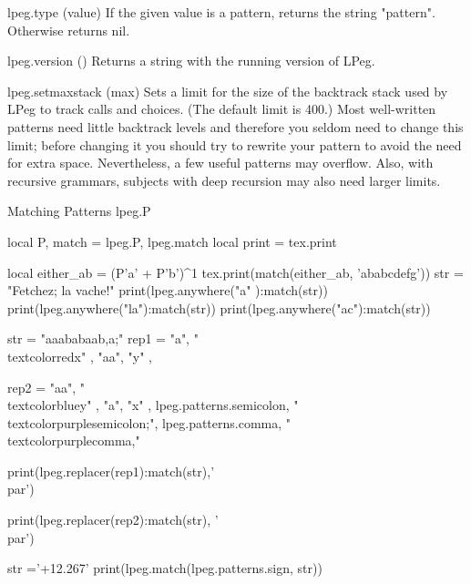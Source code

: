 \begin{docLpeg}{lpeg.type (value)}
If the given value is a pattern, returns the string "pattern". Otherwise returns nil.
\end{docLpeg}

\begin{docLpeg}{lpeg.version ()}
Returns a string with the running version of LPeg.
\end{docLpeg}

\begin{docLpeg}{lpeg.setmaxstack (max)}
Sets a limit for the size of the backtrack stack used by LPeg to track calls and choices. (The default limit is 400.) Most well-written patterns need little backtrack levels and therefore you seldom need to change this limit; before changing it you should try to rewrite your pattern to avoid the need for extra space. Nevertheless, a few useful patterns may overflow. Also, with recursive grammars, subjects with deep recursion may also need larger limits.
\end{docLpeg}


\begin{texexample}{Matching Patterns lpeg.P}{}
\begin{luacode}
local P, match = lpeg.P, lpeg.match
local print = tex.print
       
local either_ab = (P'a' + P'b')^1
        tex.print(match(either_ab,  'ababcdefg'))
     str = "Fetchez; la vache!"
print(lpeg.anywhere("a" ):match(str))
print(lpeg.anywhere("la"):match(str))
print(lpeg.anywhere("ac"):match(str))  



 str = "aaababaab,a;"
rep1 = {
    { "a",  "\\textcolor{red}{x}" },
    { "aa", "y" },
}

rep2 = {
    { "aa", "\\textcolor{blue}{y}" },
    { "a",  "x" },
    {lpeg.patterns.semicolon, "\\textcolor{purple}{semicolon;}"},
    {lpeg.patterns.comma, "\\textcolor{purple}{comma,}"}
}

print(lpeg.replacer(rep1):match(str),'\\par')

print(lpeg.replacer(rep2):match(str), '\\par') 

str ='+12.267'
print(lpeg.match(lpeg.patterns.sign, str))
\end{luacode}
\end{texexample}



